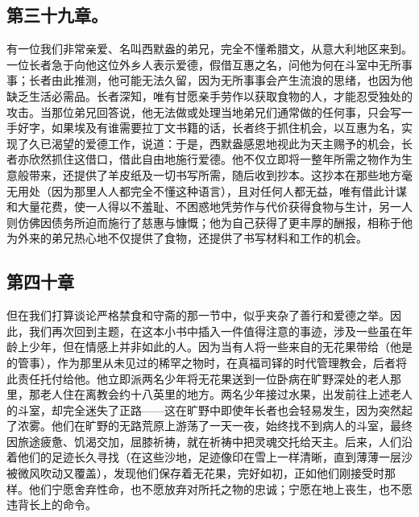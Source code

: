 
\subsection{第三十九章。}

\par

有一位我们非常亲爱、名叫西默盎的弟兄，完全不懂希腊文，从意大利地区来到。一位长者急于向他这位外乡人表示爱德，假借互惠之名，问他为何在斗室中无所事事；长者由此推测，他可能无法久留，因为无所事事会产生流浪的思绪，也因为他缺乏生活必需品。长者深知，唯有甘愿亲手劳作以获取食物的人，才能忍受独处的攻击。当那位弟兄回答说，他无法做或处理当地弟兄们通常做的任何事，只会写一手好字，如果埃及有谁需要拉丁文书籍的话，长者终于抓住机会，以互惠为名，实现了久已渴望的爱德工作，说道：于是，西默盎感恩地视此为天主赐予的机会，长者亦欣然抓住这借口，借此自由地施行爱德。他不仅立即将一整年所需之物作为生意般带来，还提供了羊皮纸及一切书写所需，随后收到抄本。这抄本在那些地方毫无用处（因为那里人人都完全不懂这种语言），且对任何人都无益，唯有借此计谋和大量花费，使一人得以不羞耻、不困惑地凭劳作与代价获得食物与生计，另一人则仿佛因债务所迫而施行了慈惠与慷慨；他为自己获得了更丰厚的酬报，相称于他为外来的弟兄热心地不仅提供了食物，还提供了书写材料和工作的机会。\par


\subsection{第四十章}

\par

但在我们打算谈论严格禁食和守斋的那一节中，似乎夹杂了善行和爱德之举。因此，我们再次回到主题，在这本小书中插入一件值得注意的事迹，涉及一些虽在年龄上少年，但在情感上并非如此的人。因为当有人将一些来自的无花果带给（他是的管事），作为那里从未见过的稀罕之物时，在真福司铎的时代管理教会，后者将此责任托付给他。他立即派两名少年将无花果送到一位卧病在旷野深处的老人那里，那老人住在离教会约十八英里的地方。两名少年接过水果，出发前往上述老人的斗室，却完全迷失了正路——这在旷野中即使年长者也会轻易发生，因为突然起了浓雾。他们在旷野的无路荒原上游荡了一天一夜，始终找不到病人的斗室，最终因旅途疲惫、饥渴交加，屈膝祈祷，就在祈祷中把灵魂交托给天主。后来，人们沿着他们的足迹长久寻找（在这些沙地，足迹像印在雪上一样清晰，直到薄薄一层沙被微风吹动又覆盖），发现他们保存着无花果，完好如初，正如他们刚接受时那样。他们宁愿舍弃性命，也不愿放弃对所托之物的忠诚；宁愿在地上丧生，也不愿违背长上的命令。\par

